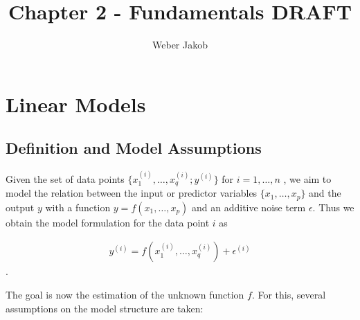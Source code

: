 \documentclass[10pt,a4paper]{report}
\title{Chapter 2 - Fundamentals DRAFT}
\author{Weber Jakob}
\begin{document}
\maketitle

\tableofcontents
\section{Linear Models} \label{sec:LinModel}
	
\subsection{Definition and Model Assumptions}  \label{subsec:LinModelDefAndAssump}

Given the set of data points $\{x^{(i)}_1, \dots, x^{(i)}_q; y^{(i)} \}$ for $i = 1, \dots, n$ , we aim to model the relation between the input or predictor variables $\{x_1, \dots, x_p\}$ and the output $y$ with a function $y = f(x_1, \dots, x_p)$ and an additive noise term $\epsilon$. Thus we obtain the model formulation for the data point $i$ as

\begin{align} \label{eq:lin_mod_single_data_point}
	y^{(i)} = f(x^{(i)}_{1}, \dots, x^{(i)}_{q}) + \epsilon^{(i)}
\end{align}.

The goal is now the estimation of the unknown function $f$. For this, several assumptions on the model structure are taken:
\end{document}
